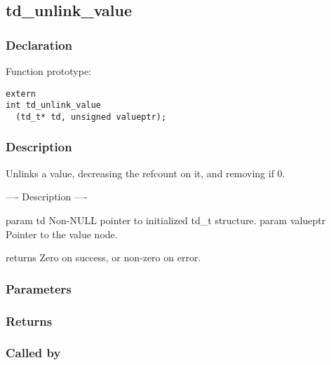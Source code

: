 
\newpage
\subsection{td\_unlink\_value}
\subsubsection{Declaration} Function prototype:

\begin{verbatim}
extern
int td_unlink_value
  (td_t* td, unsigned valueptr);
\end{verbatim}

\subsubsection{Description}


 Unlinks a value, decreasing the refcount on it, and removing if 0.

 ---- Description ----

 param td Non-NULL pointer to initialized td\_t structure.
 param valueptr Pointer to the value node.

 returns Zero on success, or non-zero on error.
 

\subsubsection{Parameters}
\subsubsection{Returns}
\subsubsection{Called by}
